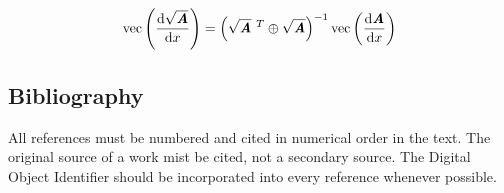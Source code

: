 \documentclass[11pt,a4paper,oneside]{article}
\newcommand{\mathbi}[1]{\bm{\textbf{\em #1}}}
\newcommand{\di}[2]{\frac{\mathrm{d} #1}{\mathrm{d} #2}}
\DeclareMathOperator{\vect}{vec}
\begin{document}
$$\vect\left(\di{\sqrt{\mathbi{A}}}{x}\right)=\left(\sqrt{\mathbi{A}}~^T\oplus\sqrt{\mathbi{A}}\right)^{-1}\vect\left(\di{\mathbi{A}}{x}\right)$$

\subsection{Bibliography}\label{subsec:biblio}
All references must be numbered and cited in numerical order in the text. The original source of a work mist be cited, not a secondary source. The Digital Object Identifier should be incorporated into every reference whenever possible.

\printbibliography
\end{document}
